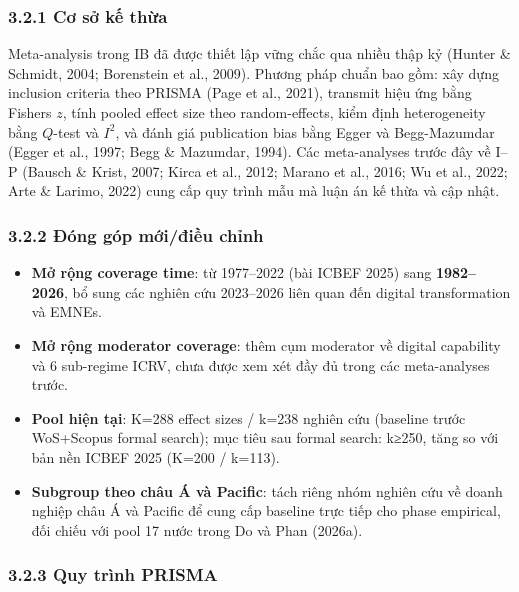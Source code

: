 \documentclass[12pt,a4paper]{article}
\providecommand{\tightlist}{\setlength{\itemsep}{0pt}\setlength{\parskip}{0pt}}
\begin{document}
\hypertarget{321-cux1a1-sux1edf-kux1ebf-thux1eeba}{%
\subsubsection{3.2.1 Cơ sở kế
thừa}\label{321-cux1a1-sux1edf-kux1ebf-thux1eeba}}

Meta-analysis trong IB đã được thiết lập vững chắc qua nhiều thập kỷ
(Hunter \& Schmidt, 2004; Borenstein et al., 2009). Phương pháp chuẩn
bao gồm: xây dựng inclusion criteria theo PRISMA (Page et al., 2021),
transmit hiệu ứng bằng Fisher\textquotesingle s \(z\), tính pooled
effect size theo random-effects, kiểm định heterogeneity bằng \(Q\)-test
và \(I^2\), và đánh giá publication bias bằng Egger và Begg-Mazumdar
(Egger et al., 1997; Begg \& Mazumdar, 1994). Các meta-analyses trước
đây về I--P (Bausch \& Krist, 2007; Kirca et al., 2012; Marano et al.,
2016; Wu et al., 2022; Arte \& Larimo, 2022) cung cấp quy trình mẫu mà
luận án kế thừa và cập nhật.

\hypertarget{322-ux111uxf3ng-guxf3p-mux1edbiux111iux1ec1u-chux1ec9nh}{%
\subsubsection{3.2.2 Đóng góp mới/điều
chỉnh}\label{322-ux111uxf3ng-guxf3p-mux1edbiux111iux1ec1u-chux1ec9nh}}

\begin{itemize}
\tightlist
\item
  \textbf{Mở rộng coverage time}: từ 1977--2022 (bài ICBEF 2025) sang
  \textbf{1982--2026}, bổ sung các nghiên cứu 2023--2026 liên quan đến
  digital transformation và EMNEs.
\item
  \textbf{Mở rộng moderator coverage}: thêm cụm moderator về digital
  capability và 6 sub-regime ICRV, chưa được xem xét đầy đủ trong các
  meta-analyses trước.
\item
  \textbf{Pool hiện tại}: K=288 effect sizes / k=238 nghiên cứu
  (baseline trước WoS+Scopus formal search); mục tiêu sau formal search:
  k≥250, tăng so với bản nền ICBEF 2025 (K=200 / k=113).
\item
  \textbf{Subgroup theo châu Á và Pacific}: tách riêng nhóm nghiên cứu
  về doanh nghiệp châu Á và Pacific để cung cấp baseline trực tiếp cho
  phase empirical, đối chiếu với pool 17 nước trong Do và Phan (2026a).
\end{itemize}

\hypertarget{323-quy-truxecnh-prisma}{%
\subsubsection{3.2.3 Quy trình PRISMA}\label{323-quy-truxecnh-prisma}}
\end{document}
